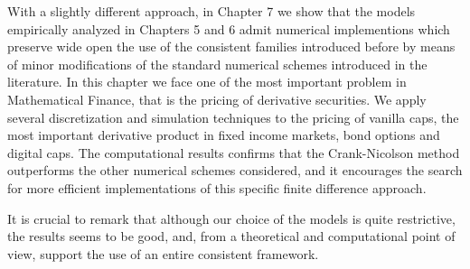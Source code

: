 \thispagestyle{empty}
With a slightly different approach, in Chapter 7 we show that the
models empirically analyzed in Chapters 5 and 6 admit numerical
implementions which preserve wide open the use of the consistent families
introduced before by means of minor modifications of the standard numerical
schemes introduced in the literature. In this chapter we face one of
the most important problem in Mathematical Finance, that is the
pricing of derivative securities. We apply several discretization
and simulation techniques to the pricing of vanilla caps, the most
important derivative product in fixed income markets, bond options and
digital caps. The computational results confirms that the Crank-Nicolson
method outperforms the other numerical schemes considered, and it
encourages the search for more efficient implementations of this
specific finite difference approach. 

 It is crucial to remark that although our choice of the models
 is quite restrictive, the results seems to be good, and, from a
 theoretical and computational point of view, support the use of an
 entire consistent framework.
